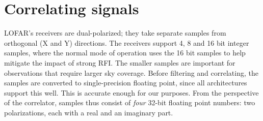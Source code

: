 \documentclass{article}
\begin{document}
\section{Correlating signals}
\label{sec:correlating}






LOFAR's receivers are dual-polarized; they take separate
samples from orthogonal (X and Y) directions.  The receivers
support 4, 8 and 16 bit integer samples, where the normal mode of
operation uses the 16 bit samples to help mitigate the impact of strong RFI. The smaller samples are important
for observations that require larger sky coverage. 
Before filtering and correlating, the
samples are converted to single-precision floating point, since all
architectures support this well.  This is
accurate enough for our purposes. From the perspective of the
correlator, samples thus consist of \emph{four} 32-bit floating point
numbers: two polarizations, each with a real and an imaginary part.
\end{document}
